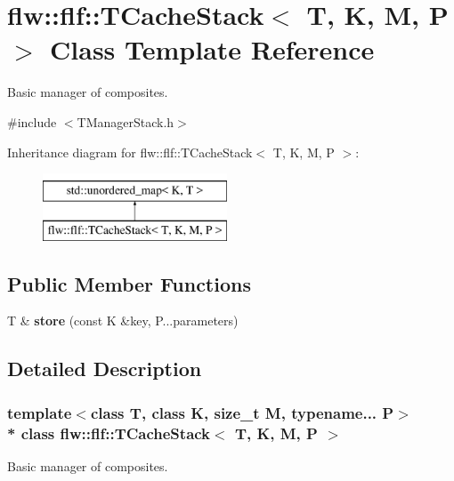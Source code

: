 \hypertarget{classflw_1_1flf_1_1TCacheStack}{}\section{flw\+:\+:flf\+:\+:T\+Cache\+Stack$<$ T, K, M, P $>$ Class Template Reference}
\label{classflw_1_1flf_1_1TCacheStack}


Basic manager of composites.  




{\ttfamily \#include $<$T\+Manager\+Stack.\+h$>$}

Inheritance diagram for flw\+:\+:flf\+:\+:T\+Cache\+Stack$<$ T, K, M, P $>$\+:\begin{figure}[H]
\begin{center}
\leavevmode
\includegraphics[height=2.000000cm]{classflw_1_1flf_1_1TCacheStack}
\end{center}
\end{figure}
\subsection*{Public Member Functions}
\begin{DoxyCompactItemize}
\item 
T \& {\bfseries store} (const K \&key, P...\+parameters)\hypertarget{classflw_1_1flf_1_1TCacheStack_aadcd8ab7cecaaf2716e044089e6f0a9c}{}\label{classflw_1_1flf_1_1TCacheStack_aadcd8ab7cecaaf2716e044089e6f0a9c}

\end{DoxyCompactItemize}


\subsection{Detailed Description}
\subsubsection*{template$<$class T, class K, size\+\_\+t M, typename... P$>$\\*
class flw\+::flf\+::\+T\+Cache\+Stack$<$ T, K, M, P $>$}

Basic manager of composites. 


